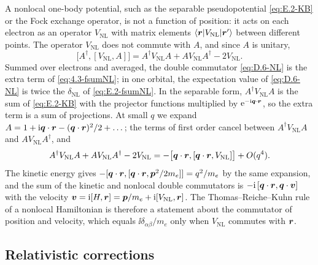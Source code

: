 A nonlocal one-body potential, such as the separable pseudopotential \cref{eq:E.2-KB} or the Fock exchange operator, is not a function of position: it acts on each electron as an operator $V_{\mathrm{NL}}$ with matrix elements $\langle\bm{r}|V_{\mathrm{NL}}|\bm{r}'\rangle$ between different points. The operator $V_{\mathrm{NL}}$ does not commute with $A$, and since $A$ is unitary,
\begin{equation}
  \bigl[A^\dagger, [V_{\mathrm{NL}}, A]\bigr] = A^\dagger V_{\mathrm{NL}}A + AV_{\mathrm{NL}}A^\dagger - 2V_{\mathrm{NL}} .
  \label{eq:D.6-NL}
\end{equation}
Summed over electrons and averaged, the double commutator \cref{eq:D.6-NL} is the extra term of \cref{eq:4.3-fsumNL}; in one orbital, the expectation value of \cref{eq:D.6-NL} is twice the $\delta_{\mathrm{NL}}$ of \cref{eq:E.2-fsumNL}. In the separable form, $A^\dagger V_{\mathrm{NL}}A$ is the sum of \cref{eq:E.2-KB} with the projector functions multiplied by $\mathrm{e}^{-\mathrm{i}\bm{q}\cdot\bm{r}}$, so the extra term is a sum of projections. At small $q$ we expand $A = 1 + \mathrm{i}\bm{q}\cdot\bm{r} - (\bm{q}\cdot\bm{r})^2/2 + \dots$; the terms of first order cancel between $A^\dagger V_{\mathrm{NL}}A$ and $AV_{\mathrm{NL}}A^\dagger$, and
\begin{equation*}
  A^\dagger V_{\mathrm{NL}}A + AV_{\mathrm{NL}}A^\dagger - 2V_{\mathrm{NL}} = -\bigl[\bm{q}\cdot\bm{r}, [\bm{q}\cdot\bm{r}, V_{\mathrm{NL}}]\bigr] + O(q^4) .
\end{equation*}
The kinetic energy gives $-[\bm{q}\cdot\bm{r}, [\bm{q}\cdot\bm{r}, \bm{p}^2/2m_e]] = q^2/m_e$ by the same expansion, and the sum of the kinetic and nonlocal double commutators is $-\mathrm{i}\,[\bm{q}\cdot\bm{r}, \bm{q}\cdot\bm{v}]$ with the velocity $\bm{v} = \mathrm{i}[H, \bm{r}] = \bm{p}/m_e + \mathrm{i}[V_{\mathrm{NL}}, \bm{r}]$. The Thomas--Reiche--Kuhn rule of a nonlocal Hamiltonian is therefore a statement about the commutator of position and velocity, which equals $\ii\delta_{\alpha\beta}/m_e$ only when $V_{\mathrm{NL}}$ commutes with $\bm{r}$.

\subsection*{Relativistic corrections}

